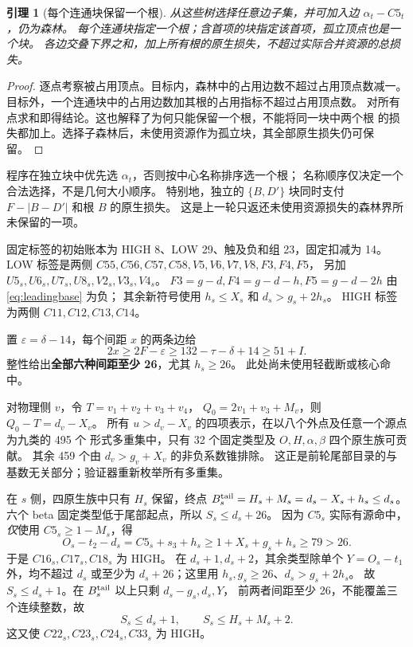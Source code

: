 \documentclass[11pt,a4paper]{article}
\newtheorem{lemma}[theorem]{引理}
\begin{document}
\begin{lemma}[每个连通块保留一个根]\label{lem:root}
从这些树选择任意边子集，并可加入边 $\alpha_t-C5_t$，仍为森林。
每个连通块指定一个根；含首项的块指定该首项，孤立顶点也是一个块。
各边交叠下界之和，加上所有根的原生损失，不超过实际合并资源的总损失。
\end{lemma}
\begin{proof}
逐点考察被占用顶点。目标内，森林中的占用边数不超过占用顶点数减一。
目标外，一个连通块中的占用边数加其根的占用指标不超过占用顶点数。
对所有点求和即得结论。这也解释了为何只能保留一个根，不能将同一块中两个根
的损失都加上。选择子森林后，未使用资源作为孤立块，其全部原生损失仍可保留。
\end{proof}
程序在独立块中优先选 $\alpha_t$，否则按中心名称排序选一个根；
名称顺序仅决定一个合法选择，不是几何大小顺序。
特别地，独立的 $\{B,D'\}$ 块同时支付
$F-|B-D'|$ 和根 $B$ 的原生损失。
这是上一轮只返还未使用资源损失的森林界所未保留的一项。

固定标签的初始账本为 HIGH 8、LOW 29、触及负和组 23，固定扣减为 14。
LOW 标签是两侧 $C55,C56,C57,C58,V5,V6,V7,V8,F3,F4,F5$，
另加 $U5_s,U6_s,U7_s,U8_s,V2_s,V3_s,V4_s$。
$F3=g-d,F4=g-d-h,F5=g-d-2h$ 由 \eqref{eq:leadingbase} 为负；
其余新符号使用 $h_s\le X_s$ 和 $d_s>g_s+2h_s$。
HIGH 标签为两侧 $C11,C12,C13,C14$。

置 $\varepsilon=\delta-14$，每个间距 $x$ 的两条边给
\[
 2x\ge2F-\varepsilon\ge132-\tau-\delta+14\ge51+I.
\]
整性给出\textbf{全部六种间距至少 26}，尤其 $h_s\ge26$。
此处尚未使用轻截断或核心命中。

对物理侧 $v$，令 $T=v_1+v_2+v_3+v_4$，
$Q_0=2v_1+v_3+M_v$，则 $Q_0-T=d_v-X_v$。
所有 $u>d_v-X_v$ 的四项表示，在以八个外点及任意一个源点为九类的 495 个
形式多重集中，只有 32 个固定类型及 $O,H,\alpha,\beta$ 四个原生族可贡献。
其余 459 个由 $d_v>g_v+X_v$ 的非负系数锥排除。
这正是前轮尾部目录的与基数无关部分；验证器重新枚举所有多重集。

在 $s$ 侧，四原生族中只有 $H_s$ 保留，终点
$B_s^{\rm tail}=H_s+M_s=d_s-X_s+h_s\le d_s$。
六个 beta 固定类型低于尾部起点，所以 $S_s\le d_s+26$。
因为 $C5_s$ 实际有源命中，\emph{仅}使用 $C5_s\ge1-M_s$，得
\[
 O_s-t_2-d_s=C5_s+s_3+h_s
 \ge1+X_s+g_s+h_s\ge79>26.
\]
于是 $C16_s,C17_s,C18_s$ 为 HIGH。
在 $d_s+1,d_s+2$，其余类型除单个 $Y=O_s-t_1$ 外，均不超过 $d_s$ 或至少为
$d_s+26$；这里用 $h_s,g_s\ge26$、$d_s>g_s+2h_s$。
故 $S_s\le d_s+1$。在 $B_s^{\rm tail}$ 以上只剩 $d_s-g_s,d_s,Y$，
前两者间距至少 26，不能覆盖三个连续整数，故
\begin{equation}S_s\le d_s+1,\qquad S_s\le H_s+M_s+2.\label{eq:stail}\end{equation}
这又使 $C22_s,C23_s,C24_s,C33_s$ 为 HIGH。
\end{document}
